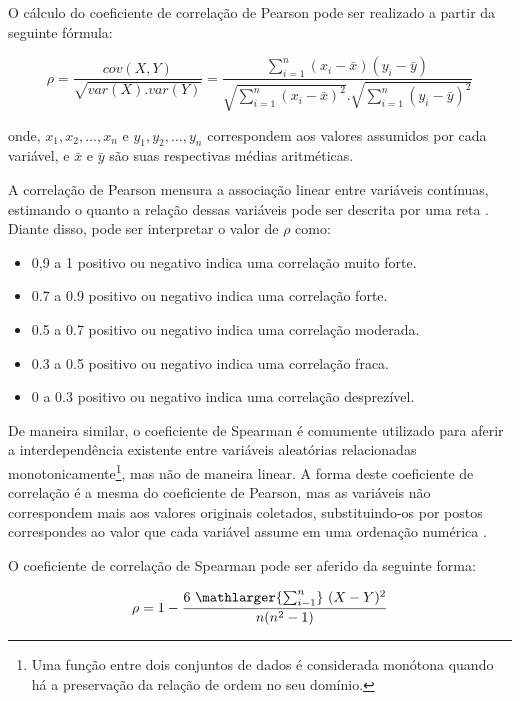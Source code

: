 O cálculo do coeficiente de correlação de Pearson pode ser realizado a partir da seguinte fórmula: 

\begin{equation}
    \rho = \frac{cov(X,Y)}{\sqrt{var(X).var(Y)}} = \frac{\sum_{i=1}^{n} (x_{i} - \bar{x})(y_{i} - \bar{y})} {\sqrt{\sum_{i=1}^{n} (x_{i} - \bar{x})^2} . \sqrt{\sum_{i=1}^{n} (y_{i} - \bar{y})^2}}
    \label{eq:2.14}
\end{equation}

\noindent onde, $x_{1}, x_{2}, ..., x_{n}$ e $y_{1}, y_{2}, ..., y_{n}$ correspondem aos valores assumidos por cada variável, e $\bar{x}$ e $\bar{y}$ são suas respectivas médias aritméticas.

A correlação de Pearson mensura a associação linear entre variáveis contínuas, estimando o quanto a relação dessas variáveis pode ser descrita por uma reta \cite{cap02_ref41}. Diante disso, pode ser interpretar o valor de $\rho$ como:

\begin{itemize}
    \item 0,9 a 1 positivo ou negativo indica uma correlação muito forte.
    \item 0.7 a 0.9 positivo ou negativo indica uma correlação forte.
    \item 0.5 a 0.7 positivo ou negativo indica uma correlação moderada.
    \item 0.3 a 0.5 positivo ou negativo indica uma correlação fraca.
    \item 0 a 0.3 positivo ou negativo indica uma correlação desprezível.
\end{itemize}

De maneira similar, o coeficiente de Spearman é comumente utilizado para aferir a interdependência existente entre variáveis aleatórias relacionadas monotonicamente\footnote{Uma função entre dois conjuntos de dados é considerada monótona quando há a preservação da relação de ordem no seu domínio.}, mas não de maneira linear. A forma deste coeficiente de correlação é a mesma do coeficiente de Pearson, mas as variáveis não correspondem mais aos valores originais coletados, substituindo-os por postos correspondes ao valor que cada variável assume em uma ordenação numérica \cite{cap02_ref39}.

O coeficiente de correlação de Spearman pode ser aferido da seguinte forma: 

\begin{equation}
    \rho = 1 - \frac{6 \ \mathlarger{\sum_{i-1}^{n}} \ (X - Y)^2}{n(n^2 - 1)}
    \label{eq:2.15}
\end{equation}

